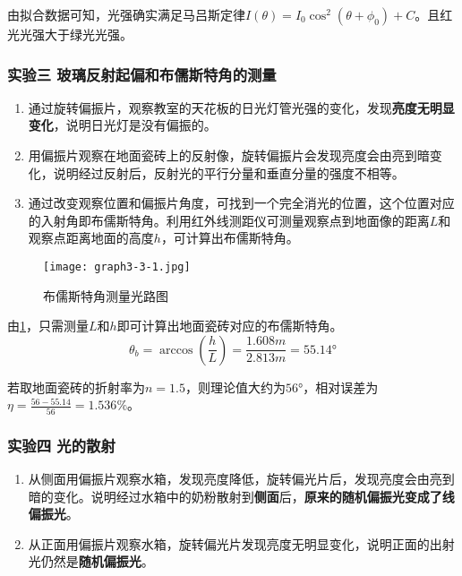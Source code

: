 \documentclass[dvipsnames, svgnames,a4paper,11pt]{article}
\begin{document}
	由拟合数据可知，光强确实满足马吕斯定律$I(\theta)=I_0\cos^2(\theta+\phi_0)+C$。且红光光强大于绿光光强。
			



	\subsubsection{实验三 \quad 玻璃反射起偏和布儒斯特角的测量}

	\begin{enumerate}
		\item 通过旋转偏振片，观察教室的天花板的日光灯管光强的变化，发现\textbf{亮度无明显变化}，说明日光灯是没有偏振的。
		\item 用偏振片观察在地面瓷砖上的反射像，旋转偏振片会发现亮度会由亮到暗变化，说明经过反射后，反射光的平行分量和垂直分量的强度不相等。\\
		\item 通过改变观察位置和偏振片角度，可找到一个完全消光的位置，这个位置对应的入射角即布儒斯特角。利用红外线测距仪可测量观察点到地面像的距离$L$和观察点距离地面的高度$h$，可计算出布儒斯特角。
	\end{enumerate}
	


	\begin{figure}[htbp]
		\centering
		\texttt{[image: graph3-3-1.jpg]}
		\caption{布儒斯特角测量光路图}
		\label{fig:graph3-3-1}
	\end{figure}

	由\cref{fig:graph3-3-1}，只需测量$L$和$h$即可计算出地面瓷砖对应的布儒斯特角。
	\[
	\theta_b=\arccos(\frac{h}{L})=\frac{1.608m}{2.813m}=\ang{55.14}	
	\]
	
	若取地面瓷砖的折射率为$n=1.5$，则理论值大约为$\ang{56}$，相对误差为$\eta=\frac{56-55.14}{56}=1.536\%$。



	\subsubsection{实验四 \quad 光的散射}

	\begin{enumerate}
		\item 从侧面用偏振片观察水箱，发现亮度降低，旋转偏光片后，发现亮度会由亮到暗的变化。说明经过水箱中的奶粉散射到\textbf{侧面}后，\textbf{原来的随机偏振光变成了线偏振光}。
		\item 从正面用偏振片观察水箱，旋转偏光片发现亮度无明显变化，说明正面的出射光仍然是\textbf{随机偏振光}。
	\end{enumerate}
	
\end{document}
